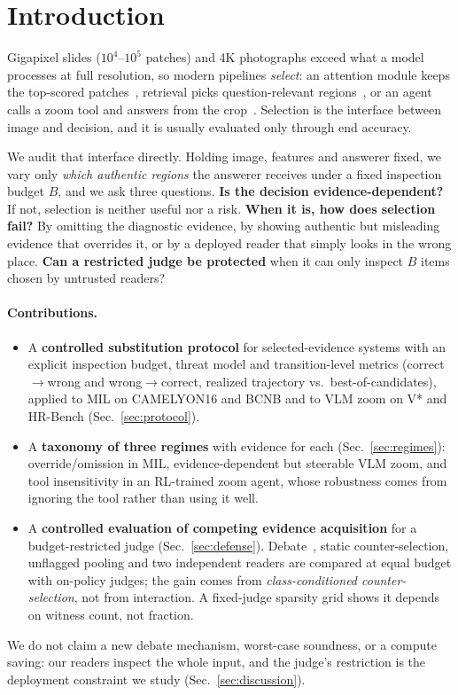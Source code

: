 \documentclass[10pt,twocolumn,letterpaper]{article}
\begin{document}
\section{Introduction}\label{sec:intro}
Gigapixel slides ($10^4$--$10^5$ patches) and 4K photographs exceed what a model processes at full resolution, so modern pipelines \emph{select}: an attention module keeps the top-scored patches~\cite{ilse2018abmil}, retrieval picks question-relevant regions~\cite{beacon2026}, or an agent calls a zoom tool and answers from the crop~\cite{wu2024vstar,zheng2025deepeyes}. Selection is the interface between image and decision, and it is usually evaluated only through end accuracy.

We audit that interface directly. Holding image, features and answerer fixed, we vary only \emph{which authentic regions} the answerer receives under a fixed inspection budget $B$, and we ask three questions. \textbf{Is the decision evidence-dependent?} If not, selection is neither useful nor a risk. \textbf{When it is, how does selection fail?} By omitting the diagnostic evidence, by showing authentic but misleading evidence that overrides it, or by a deployed reader that simply looks in the wrong place. \textbf{Can a restricted judge be protected} when it can only inspect $B$ items chosen by untrusted readers?

\paragraph{Contributions.}
\begin{itemize}
\item A \textbf{controlled substitution protocol} for selected-evidence systems with an explicit inspection budget, threat model and transition-level metrics (correct$\to$wrong and wrong$\to$correct, realized trajectory vs.\ best-of-candidates), applied to MIL on CAMELYON16 and BCNB and to VLM zoom on V* and HR-Bench (Sec.~\ref{sec:protocol}).
\item A \textbf{taxonomy of three regimes} with evidence for each (Sec.~\ref{sec:regimes}): override/omission in MIL, evidence-dependent but steerable VLM zoom, and tool insensitivity in an RL-trained zoom agent, whose robustness comes from ignoring the tool rather than using it well.
\item A \textbf{controlled evaluation of competing evidence acquisition} for a budget-restricted judge (Sec.~\ref{sec:defense}). Debate~\cite{irving2018debate}, static counter-selection, unflagged pooling and two independent readers are compared at equal budget with on-policy judges; the gain comes from \emph{class-conditioned counter-selection}, not from interaction. A fixed-judge sparsity grid shows it depends on witness count, not fraction.
\end{itemize}
We do not claim a new debate mechanism, worst-case soundness, or a compute saving: our readers inspect the whole input, and the judge's restriction is the deployment constraint we study (Sec.~\ref{sec:discussion}).
\end{document}
